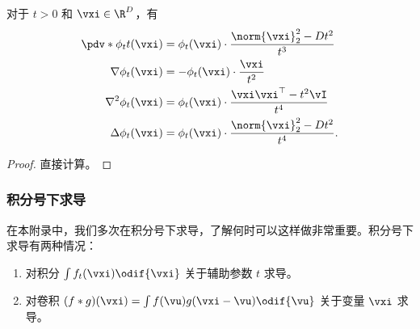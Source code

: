 \documentclass[../../book-main_zh.tex]{subfiles}
\begin{document}
\begin{proposition}\label{prop:normal_derivatives}
    对于 \(t > 0\) 和 \(\vxi \in \R^{D}\)，有
    \begin{align}
        \pdv*{\phi_{t}}{t}(\vxi)
        &= \phi_{t}(\vxi) \cdot \frac{\norm{\vxi}_{2}^{2} - Dt^{2}}{t^{3}} \\
        \nabla \phi_{t}(\vxi)
        &= -\phi_{t}(\vxi)\cdot\frac{\vxi}{t^{2}} \\
        \nabla^{2} \phi_{t}(\vxi)
        &= \phi_{t}(\vxi)\cdot\frac{\vxi\vxi^{\top} - t^{2}\vI}{t^{4}} \\
        \Delta \phi_{t}(\vxi)
        &= \phi_{t}(\vxi) \cdot \frac{\norm{\vxi}_{2}^{2} - Dt^{2}}{t^{4}}.
    \end{align}
\end{proposition}
\begin{proof}
    直接计算。
\end{proof}

\subsubsection{积分号下求导}

在本附录中，我们多次在积分号下求导，了解何时可以这样做非常重要。积分号下求导有两种情况：
\begin{enumerate}
    \item 对积分 \(\int f_{t}(\vxi)\odif{\vxi}\) 关于辅助参数 \(t\) 求导。
    \item 对卷积 \((f * g)(\vxi) = \int f(\vu)g(\vxi - \vu)\odif{\vu}\) 关于变量 \(\vxi\) 求导。
\end{enumerate}
\end{document}
